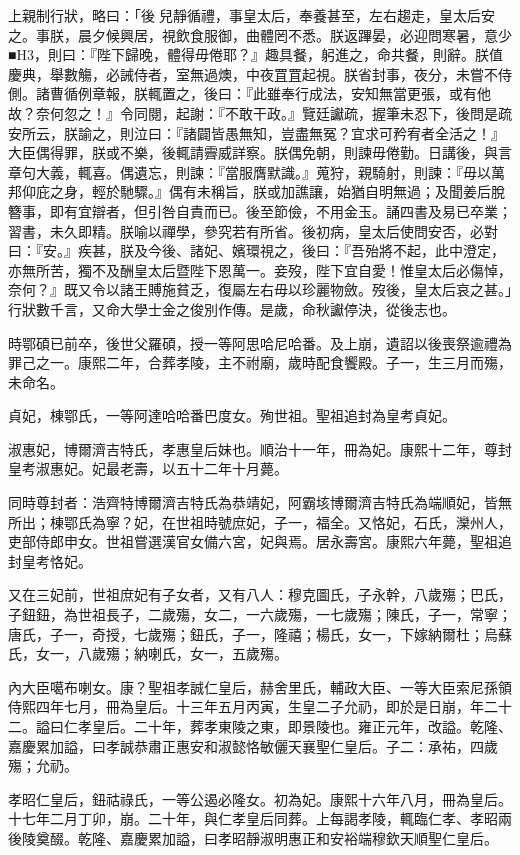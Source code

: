 \begin{pinyinscope}
上親制行狀，略曰：「後兒靜循禮，事皇太后，奉養甚至，左右趨走，皇太后安之。事朕，晨夕候興居，視飲食服御，曲體罔不悉。朕返蹕晏，必迎問寒暑，意少■H3，則曰：『陛下歸晚，體得毋倦耶？』趣具餐，躬進之，命共餐，則辭。朕值慶典，舉數觴，必誡侍者，室無過燠，中夜罝罝起視。朕省封事，夜分，未嘗不侍側。諸曹循例章報，朕輒置之，後曰：『此雖奉行成法，安知無當更張，或有他故？奈何忽之！』令同閱，起謝：『不敢干政。』覽廷讞疏，握筆未忍下，後問是疏安所云，朕諭之，則泣曰：『諸闢皆愚無知，豈盡無冤？宜求可矜宥者全活之！』大臣偶得罪，朕或不樂，後輒請霽威詳察。朕偶免朝，則諫毋倦勤。日講後，與言章句大義，輒喜。偶遺忘，則諫：『當服膺默識。』蒐狩，親騎射，則諫：『毋以萬邦仰庇之身，輕於馳驟。』偶有未稱旨，朕或加譙讓，始猶自明無過；及聞姜后脫簪事，即有宜辯者，但引咎自責而已。後至節儉，不用金玉。誦四書及易已卒業；習書，未久即精。朕喻以禪學，參究若有所省。後初病，皇太后使問安否，必對曰：『安。』疾甚，朕及今後、諸妃、嬪環視之，後曰：『吾殆將不起，此中澄定，亦無所苦，獨不及酬皇太后暨陛下恩萬一。妾歿，陛下宜自愛！惟皇太后必傷悼，奈何？』既又令以諸王賻施貧乏，復屬左右毋以珍麗物斂。歿後，皇太后哀之甚。」行狀數千言，又命大學士金之俊別作傳。是歲，命秋讞停決，從後志也。

時鄂碩已前卒，後世父羅碩，授一等阿思哈尼哈番。及上崩，遺詔以後喪祭逾禮為罪己之一。康熙二年，合葬孝陵，主不祔廟，歲時配食饗殿。子一，生三月而殤，未命名。

貞妃，棟鄂氏，一等阿達哈哈番巴度女。殉世祖。聖祖追封為皇考貞妃。

淑惠妃，博爾濟吉特氏，孝惠皇后妹也。順治十一年，冊為妃。康熙十二年，尊封皇考淑惠妃。妃最老壽，以五十二年十月薨。

同時尊封者：浩齊特博爾濟吉特氏為恭靖妃，阿霸垓博爾濟吉特氏為端順妃，皆無所出；棟鄂氏為寧？妃，在世祖時號庶妃，子一，福全。又恪妃，石氏，灤州人，吏部侍郎申女。世祖嘗選漢官女備六宮，妃與焉。居永壽宮。康熙六年薨，聖祖追封皇考恪妃。

又在三妃前，世祖庶妃有子女者，又有八人：穆克圖氏，子永幹，八歲殤；巴氏，子鈕鈕，為世祖長子，二歲殤，女二，一六歲殤，一七歲殤；陳氏，子一，常寧；唐氏，子一，奇授，七歲殤；鈕氏，子一，隆禧；楊氏，女一，下嫁納爾杜；烏蘇氏，女一，八歲殤；納喇氏，女一，五歲殤。

內大臣噶布喇女。康？聖祖孝誠仁皇后，赫舍里氏，輔政大臣、一等大臣索尼孫領侍熙四年七月，冊為皇后。十三年五月丙寅，生皇二子允礽，即於是日崩，年二十二。謚曰仁孝皇后。二十年，葬孝東陵之東，即景陵也。雍正元年，改謚。乾隆、嘉慶累加謚，曰孝誠恭肅正惠安和淑懿恪敏儷天襄聖仁皇后。子二：承祐，四歲殤；允礽。

孝昭仁皇后，鈕祜祿氏，一等公遏必隆女。初為妃。康熙十六年八月，冊為皇后。十七年二月丁卯，崩。二十年，與仁孝皇后同葬。上每謁孝陵，輒臨仁孝、孝昭兩後陵奠醊。乾隆、嘉慶累加謚，曰孝昭靜淑明惠正和安裕端穆欽天順聖仁皇后。


\end{pinyinscope}
